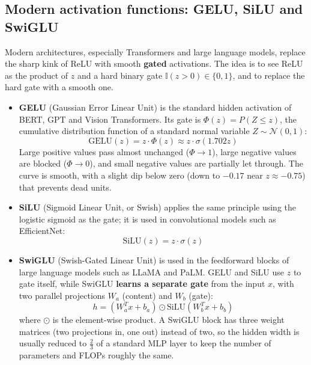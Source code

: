 \subsection{Modern activation functions: GELU, SiLU and SwiGLU}
Modern architectures, especially Transformers and large language models, replace
the sharp kink of ReLU with smooth \textbf{gated} activations. The idea is to see
ReLU as the product of $z$ and a hard binary gate $\mathbb{I}(z > 0) \in \{0,1\}$,
and to replace the hard gate with a smooth one.
\begin{itemize}
    \item \textbf{GELU} (Gaussian Error Linear Unit) is the standard hidden
          activation of BERT, GPT and Vision Transformers. Its gate is
          $\Phi(z) = P(Z \leq z)$, the cumulative distribution function of a
          standard normal variable $Z \sim \mathcal{N}(0, 1)$:
          \begin{equation}
              \text{GELU}(z) = z \cdot \Phi(z) \approx z \cdot \sigma(1.702 z)
          \end{equation}
          Large positive values pass almost unchanged ($\Phi \to 1$), large negative
          values are blocked ($\Phi \to 0$), and small negative values are partially
          let through. The curve is smooth, with a slight dip below zero (down to
          $-0.17$ near $z \approx -0.75$) that prevents dead units.
    \item \textbf{SiLU} (Sigmoid Linear Unit, or Swish) applies the same principle
          using the logistic sigmoid as the gate; it is used in convolutional
          models such as EfficientNet:
          \begin{equation}
              \text{SiLU}(z) = z \cdot \sigma(z)
          \end{equation}
    \item \textbf{SwiGLU} (Swish-Gated Linear Unit) is used in the feedforward
          blocks of large language models such as LLaMA and PaLM. GELU and SiLU use
          $z$ to gate itself, while SwiGLU \textbf{learns a separate gate} from the
          input $x$, with two parallel projections $W_a$ (content) and $W_b$ (gate):
          \begin{equation}
              h = (W_a^T x + b_a) \odot \text{SiLU}(W_b^T x + b_b)
          \end{equation}
          where $\odot$ is the element-wise product. A SwiGLU block has three weight
          matrices (two projections in, one out) instead of two, so the hidden width
          is usually reduced to $\frac{2}{3}$ of a standard MLP layer to keep the
          number of parameters and FLOPs roughly the same.
\end{itemize}

